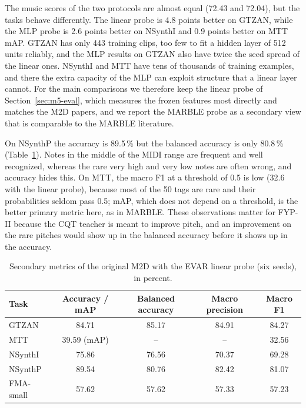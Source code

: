 The music scores of the two protocols are almost equal (72.43 and 72.04), but the tasks behave differently. The linear probe is 4.8 points better on GTZAN, while the MLP probe is 2.6 points better on NSynthI and 0.9 points better on MTT mAP. GTZAN has only 443 training clips, too few to fit a hidden layer of 512 units reliably, and the MLP results on GTZAN also have twice the seed spread of the linear ones. NSynthI and MTT have tens of thousands of training examples, and there the extra capacity of the MLP can exploit structure that a linear layer cannot. For the main comparisons we therefore keep the linear probe of Section~\ref{sec:m5-eval}, which measures the frozen features most directly and matches the M2D papers, and we report the MARBLE probe as a secondary view that is comparable to the MARBLE literature.

On NSynthP the accuracy is 89.5\,\% but the balanced accuracy is only 80.8\,\% (Table~\ref{tab:res-secondary}). Notes in the middle of the MIDI range are frequent and well recognized, whereas the rare very high and very low notes are often wrong, and accuracy hides this. On MTT, the macro F1 at a threshold of 0.5 is low (32.6 with the linear probe), because most of the 50 tags are rare and their probabilities seldom pass 0.5; mAP, which does not depend on a threshold, is the better primary metric here, as in MARBLE. These observations matter for FYP-II because the CQT teacher is meant to improve pitch, and an improvement on the rare pitches would show up in the balanced accuracy before it shows up in the accuracy.

\begin{table}[htbp]
\centering
\caption[Secondary metrics of the original M2D]{Secondary metrics of the original M2D with the EVAR linear probe (six seeds), in percent.}
\label{tab:res-secondary}
\small\singlespacing
\begin{tabular}{lcccc}
\toprule
\textbf{Task} & \textbf{Accuracy / mAP} & \textbf{Balanced accuracy} & \textbf{Macro precision} & \textbf{Macro F1}\\
\midrule
GTZAN & 84.71 & 85.17 & 84.91 & 84.27\\
MTT & 39.59 (mAP) & -- & -- & 32.56\\
NSynthI & 75.86 & 76.56 & 70.37 & 69.28\\
NSynthP & 89.54 & 80.76 & 82.42 & 81.07\\
FMA-small & 57.62 & 57.62 & 57.33 & 57.23\\
\bottomrule
\end{tabular}
\end{table}

